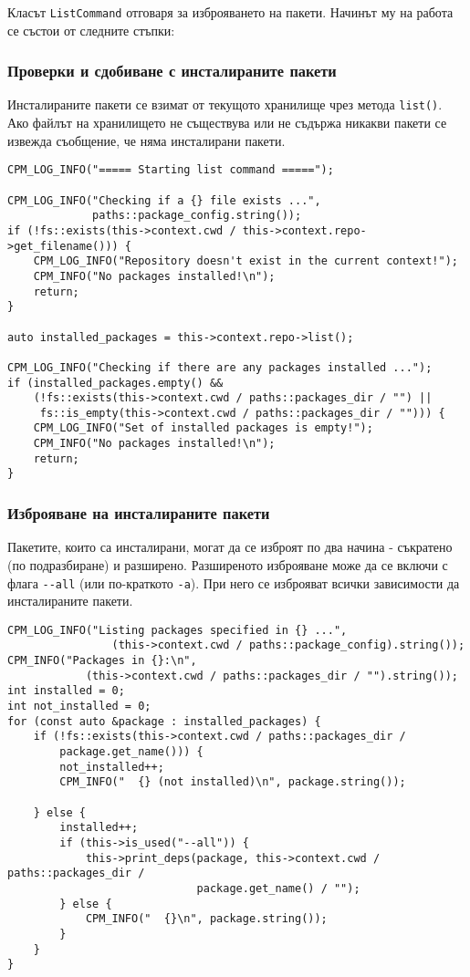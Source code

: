 Класът \texttt{ListCommand} отговаря за изброяването на пакети. Начинът му
на работа се състои от следните стъпки:

\subsubsection{Проверки и сдобиване с инсталираните пакети}

Инсталираните пакети се взимат от текущото хранилище чрез метода
\texttt{list()}. Ако файлът на хранилището не съществува или не съдържа никакви
пакети се извежда съобщение, че няма инсталирани пакети.

\begin{lstlisting}[style=cpp,
				   caption=Команда за изброяване,
				   label={lst:list-get}]
CPM_LOG_INFO("===== Starting list command =====");

CPM_LOG_INFO("Checking if a {} file exists ...",
			 paths::package_config.string());
if (!fs::exists(this->context.cwd / this->context.repo->get_filename())) {
	CPM_LOG_INFO("Repository doesn't exist in the current context!");
	CPM_INFO("No packages installed!\n");
	return;
}

auto installed_packages = this->context.repo->list();

CPM_LOG_INFO("Checking if there are any packages installed ...");
if (installed_packages.empty() &&
	(!fs::exists(this->context.cwd / paths::packages_dir / "") ||
	 fs::is_empty(this->context.cwd / paths::packages_dir / ""))) {
	CPM_LOG_INFO("Set of installed packages is empty!");
	CPM_INFO("No packages installed!\n");
	return;
}
\end{lstlisting}


\subsubsection{Изброяване на инсталираните пакети}

Пакетите, които са инсталирани, могат да се изброят по два начина - съкратено
(по подразбиране) и разширено. Разширеното изброяване може да се включи с флага
\texttt{-{}-all} (или по-краткото \texttt{-a}). При него се изброяват всички
зависимости да инсталираните пакети.

\begin{lstlisting}[style=cpp,
				   caption=Команда за изброяване,
				   label={lst:list-installed}]
CPM_LOG_INFO("Listing packages specified in {} ...",
				(this->context.cwd / paths::package_config).string());
CPM_INFO("Packages in {}:\n",
			(this->context.cwd / paths::packages_dir / "").string());
int installed = 0;
int not_installed = 0;
for (const auto &package : installed_packages) {
	if (!fs::exists(this->context.cwd / paths::packages_dir /
		package.get_name())) {
		not_installed++;
		CPM_INFO("  {} (not installed)\n", package.string());

	} else {
		installed++;
		if (this->is_used("--all")) {
			this->print_deps(package, this->context.cwd / paths::packages_dir /
							 package.get_name() / "");
		} else {
			CPM_INFO("  {}\n", package.string());
		}
	}
}
\end{lstlisting}


